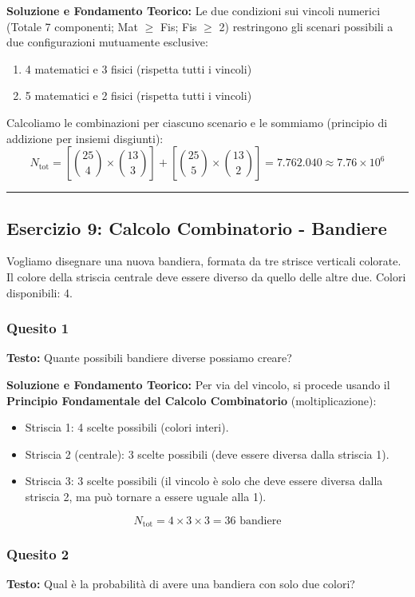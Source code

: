 \documentclass[12pt, a4paper]{article}
\begin{document}
\textbf{Soluzione e Fondamento Teorico:} 
Le due condizioni sui vincoli numerici (Totale 7 componenti; Mat $\ge$ Fis; Fis $\ge$ 2) restringono gli scenari possibili a due configurazioni mutuamente esclusive:
\begin{enumerate}
    \item 4 matematici e 3 fisici (rispetta tutti i vincoli)
    \item 5 matematici e 2 fisici (rispetta tutti i vincoli)
\end{enumerate}
Calcoliamo le combinazioni per ciascuno scenario e le sommiamo (principio di addizione per insiemi disgiunti):
$$ N_{\text{tot}} = \left[\binom{25}{4} \times \binom{13}{3}\right] + \left[\binom{25}{5} \times \binom{13}{2}\right] = 7.762.040 \approx 7.76 \times 10^6 $$

\vspace{0.5cm}\hrule\vspace{0.5cm}

\subsection*{Esercizio 9: Calcolo Combinatorio - Bandiere}
Vogliamo disegnare una nuova bandiera, formata da tre strisce verticali colorate. Il colore della striscia centrale deve essere diverso da quello delle altre due. Colori disponibili: 4.

\subsubsection*{Quesito 1}
\textbf{Testo:} Quante possibili bandiere diverse possiamo creare?

\textbf{Soluzione e Fondamento Teorico:} 
Per via del vincolo, si procede usando il \textbf{Principio Fondamentale del Calcolo Combinatorio} (moltiplicazione):
\begin{itemize}
    \item Striscia 1: 4 scelte possibili (colori interi).
    \item Striscia 2 (centrale): 3 scelte possibili (deve essere diversa dalla striscia 1).
    \item Striscia 3: 3 scelte possibili (il vincolo è solo che deve essere diversa dalla striscia 2, ma può tornare a essere uguale alla 1).
\end{itemize}
$$ N_{\text{tot}} = 4 \times 3 \times 3 = 36 \text{ bandiere} $$

\subsubsection*{Quesito 2}
\textbf{Testo:} Qual è la probabilità di avere una bandiera con solo due colori?
\end{document}
